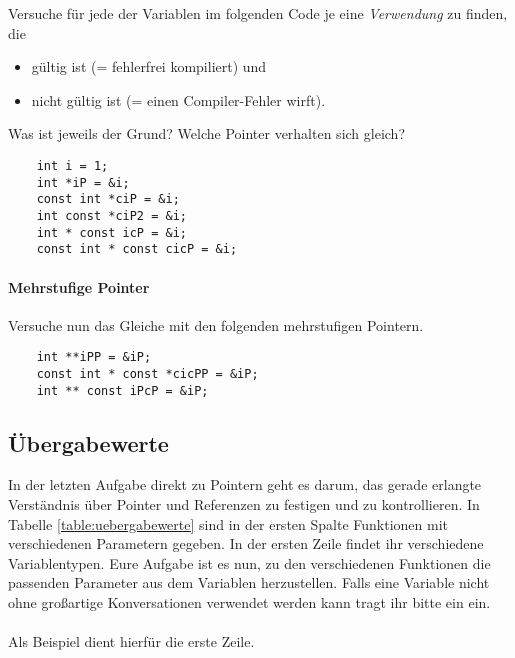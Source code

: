 Versuche für jede der Variablen im folgenden Code je eine \emph{Verwendung} zu finden, die  
\begin{itemize}
\item gültig ist (= fehlerfrei kompiliert) und
\item nicht gültig ist (= einen Compiler-Fehler wirft).
\end{itemize}


Was ist jeweils der Grund?
Welche Pointer verhalten sich gleich?

\begin{lstlisting}
    int i = 1;    
    int *iP = &i;
    const int *ciP = &i;
    int const *ciP2 = &i;
    int * const icP = &i;    
    const int * const cicP = &i;
\end{lstlisting}

\paragraph{Mehrstufige Pointer}

Versuche nun das Gleiche mit den folgenden mehrstufigen Pointern.

\begin{lstlisting}
    int **iPP = &iP;
    const int * const *cicPP = &iP;
    int ** const iPcP = &iP;
\end{lstlisting}


\subsection{Übergabewerte}
In der letzten Aufgabe direkt zu Pointern geht es darum, das gerade erlangte Verständnis über Pointer und Referenzen zu festigen und zu kontrollieren.
In Tabelle \ref{table:uebergabewerte} sind in der ersten Spalte Funktionen mit verschiedenen Parametern gegeben.
In der ersten Zeile findet ihr verschiedene Variablentypen.
Eure Aufgabe ist es nun, zu den verschiedenen Funktionen die passenden Parameter aus dem Variablen herzustellen.
Falls eine Variable nicht ohne großartige Konversationen verwendet werden kann tragt ihr bitte ein \xmark ein. \\\\
Als Beispiel dient hierfür die erste Zeile. 

